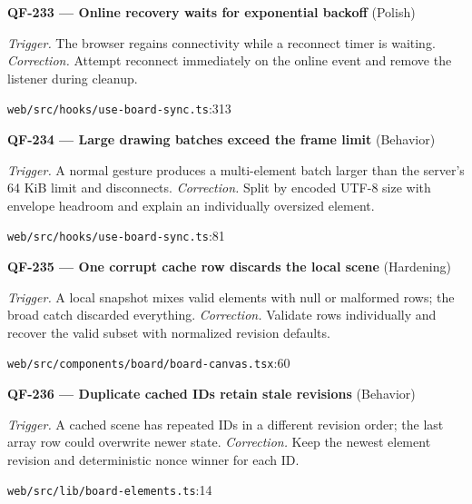 \begin{minipage}{\linewidth}
\textbf{QF-233 --- Online recovery waits for exponential backoff} {\scriptsize\color{accent}(Polish)}\par
\textit{Trigger.} The browser regains connectivity while a reconnect timer is waiting. \textit{Correction.} Attempt reconnect immediately on the online event and remove the listener during cleanup.\par
{\scriptsize\color{muted}\nolinkurl{web/src/hooks/use-board-sync.ts}:313}\par
\end{minipage}\par\vspace{7pt}
\begin{minipage}{\linewidth}
\textbf{QF-234 --- Large drawing batches exceed the frame limit} {\scriptsize\color{accent}(Behavior)}\par
\textit{Trigger.} A normal gesture produces a multi-element batch larger than the server's 64 KiB limit and disconnects. \textit{Correction.} Split by encoded UTF-8 size with envelope headroom and explain an individually oversized element.\par
{\scriptsize\color{muted}\nolinkurl{web/src/hooks/use-board-sync.ts}:81}\par
\end{minipage}\par\vspace{7pt}
\begin{minipage}{\linewidth}
\textbf{QF-235 --- One corrupt cache row discards the local scene} {\scriptsize\color{accent}(Hardening)}\par
\textit{Trigger.} A local snapshot mixes valid elements with null or malformed rows; the broad catch discarded everything. \textit{Correction.} Validate rows individually and recover the valid subset with normalized revision defaults.\par
{\scriptsize\color{muted}\nolinkurl{web/src/components/board/board-canvas.tsx}:60}\par
\end{minipage}\par\vspace{7pt}
\begin{minipage}{\linewidth}
\textbf{QF-236 --- Duplicate cached IDs retain stale revisions} {\scriptsize\color{accent}(Behavior)}\par
\textit{Trigger.} A cached scene has repeated IDs in a different revision order; the last array row could overwrite newer state. \textit{Correction.} Keep the newest element revision and deterministic nonce winner for each ID.\par
{\scriptsize\color{muted}\nolinkurl{web/src/lib/board-elements.ts}:14}\par
\end{minipage}\par\vspace{7pt}
